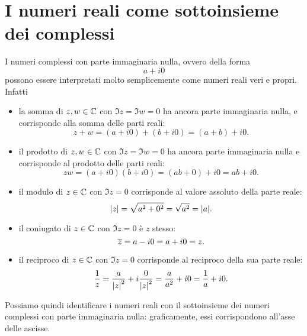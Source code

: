 \section{I numeri reali come sottoinsieme dei complessi}

I numeri complessi con parte immaginaria nulla, ovvero della forma \[
    a + i0    
\] possono essere interpretati molto semplicemente come numeri reali veri e propri.
Infatti \begin{itemize}
    \item la somma di $z, w \in \C$ con $\Im z = \Im w = 0$ ha ancora parte immaginaria nulla, e corrisponde alla somma delle parti reali: \[
        z + w = (a + i0) + (b + i0) = (a + b) + i0.    
    \]
    \item il prodotto di $z, w \in \C$ con $\Im z = \Im w = 0$ ha ancora parte immaginaria nulla e corrisponde al prodotto delle parti reali: \[
        zw = (a + i0)(b + i0) = (ab + 0) + i0 = ab + i0.    
    \]
    \item il modulo di $z \in \C$ con $\Im z = 0$ corrisponde al valore assoluto della parte reale: \[
        \abs*{z} = \sqrt{a^2 + 0^2} = \sqrt{a^2} = \abs*{a}.    
    \]
    \item il coniugato di $z \in \C$ con $\Im z = 0$ è $z$ stesso: \[
        \conj z = a - i0 = a + i0 = z.    
    \]
    \item il reciproco di $z \in \C$ con $\Im z = 0$ corrisponde al reciproco della sua parte reale: \[
        \frac1z = \frac{a}{\abs*{z}^2} + i\frac{0}{\abs*{z}^2} = \frac{a}{a^2} + i0 = \frac1a + i0. 
    \]
\end{itemize}

Possiamo quindi identificare i numeri reali con il sottoinsieme dei numeri complessi con parte immaginaria nulla: graficamente, essi corrispondono all'asse delle ascisse.